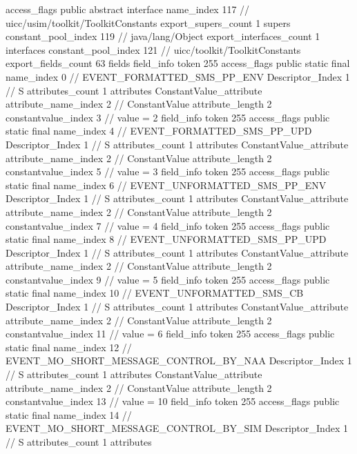 {{{			access_flags	public abstract interface
			name_index	117		// uicc/usim/toolkit/ToolkitConstants
			export_supers_count	1
			supers {
				constant_pool_index	119		// java/lang/Object
			}
			export_interfaces_count	1
			interfaces {
				constant_pool_index	121		// uicc/toolkit/ToolkitConstants
			}
			export_fields_count	63
			fields {
			field_info {
				token	255
				access_flags	public static final
				name_index	0		// EVENT_FORMATTED_SMS_PP_ENV
				Descriptor_Index	1		// S
				attributes_count	1
				attributes {
				ConstantValue_attribute {
					attribute_name_index	2		// ConstantValue
					attribute_length	2
					constantvalue_index	3		// value = 2
				}
				}
			}
			field_info {
				token	255
				access_flags	public static final
				name_index	4		// EVENT_FORMATTED_SMS_PP_UPD
				Descriptor_Index	1		// S
				attributes_count	1
				attributes {
				ConstantValue_attribute {
					attribute_name_index	2		// ConstantValue
					attribute_length	2
					constantvalue_index	5		// value = 3
				}
				}
			}
			field_info {
				token	255
				access_flags	public static final
				name_index	6		// EVENT_UNFORMATTED_SMS_PP_ENV
				Descriptor_Index	1		// S
				attributes_count	1
				attributes {
				ConstantValue_attribute {
					attribute_name_index	2		// ConstantValue
					attribute_length	2
					constantvalue_index	7		// value = 4
				}
				}
			}
			field_info {
				token	255
				access_flags	public static final
				name_index	8		// EVENT_UNFORMATTED_SMS_PP_UPD
				Descriptor_Index	1		// S
				attributes_count	1
				attributes {
				ConstantValue_attribute {
					attribute_name_index	2		// ConstantValue
					attribute_length	2
					constantvalue_index	9		// value = 5
				}
				}
			}
			field_info {
				token	255
				access_flags	public static final
				name_index	10		// EVENT_UNFORMATTED_SMS_CB
				Descriptor_Index	1		// S
				attributes_count	1
				attributes {
				ConstantValue_attribute {
					attribute_name_index	2		// ConstantValue
					attribute_length	2
					constantvalue_index	11		// value = 6
				}
				}
			}
			field_info {
				token	255
				access_flags	public static final
				name_index	12		// EVENT_MO_SHORT_MESSAGE_CONTROL_BY_NAA
				Descriptor_Index	1		// S
				attributes_count	1
				attributes {
				ConstantValue_attribute {
					attribute_name_index	2		// ConstantValue
					attribute_length	2
					constantvalue_index	13		// value = 10
				}
				}
			}
			field_info {
				token	255
				access_flags	public static final
				name_index	14		// EVENT_MO_SHORT_MESSAGE_CONTROL_BY_SIM
				Descriptor_Index	1		// S
				attributes_count	1
				attributes {
}}}}}}
